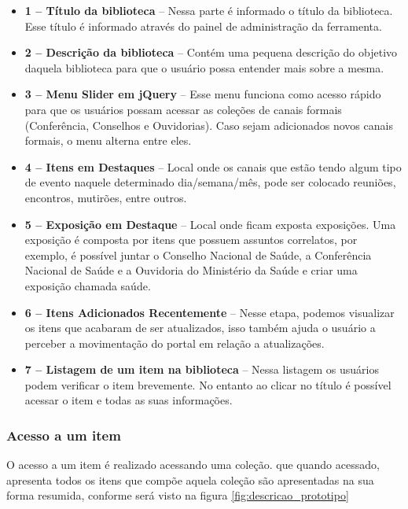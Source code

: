 \begin{itemize}
	\item \textbf{1 – Título da biblioteca} – Nessa parte é informado o título da biblioteca. Esse título é informado através do painel de administração da ferramenta.
	\item \textbf{2 – Descrição da biblioteca} – Contém uma pequena descrição do objetivo daquela biblioteca para que o usuário possa entender mais sobre a mesma.
	\item \textbf{3 – Menu Slider em jQuery} – Esse menu funciona como acesso rápido para que os usuários possam acessar as coleções de canais formais (Conferência, Conselhos e Ouvidorias). Caso sejam adicionados novos canais formais, o menu alterna entre eles.
	\item \textbf{4 – Itens em Destaques} – Local onde os canais que estão tendo algum tipo de evento naquele determinado dia/semana/mês, pode ser colocado reuniões, encontros, mutirões, entre outros.
	\item \textbf{5 – Exposição em Destaque} – Local onde ficam exposta exposições. Uma exposição é composta por itens que possuem assuntos correlatos, por exemplo, é possível juntar o Conselho Nacional de Saúde, a Conferência Nacional de Saúde e a Ouvidoria do Ministério da Saúde e criar uma exposição chamada saúde.	
	\item \textbf{6 – Itens Adicionados Recentemente} – Nesse etapa, podemos visualizar os itens que acabaram de ser atualizados, isso também ajuda o usuário a perceber a movimentação do portal em relação a atualizações.
	\item \textbf{7 – Listagem de um item na biblioteca} – Nessa listagem os usuários podem verificar o item brevemente. No entanto ao clicar no título é possível acessar o item e todas as suas informações.
\end{itemize}

\subsubsection{Acesso a um item}

O acesso a um item é realizado acessando uma coleção. que quando acessado, apresenta todos os itens que compõe aquela coleção são apresentadas na sua forma resumida, conforme será visto na figura \ref{fig:descricao_prototipo}

